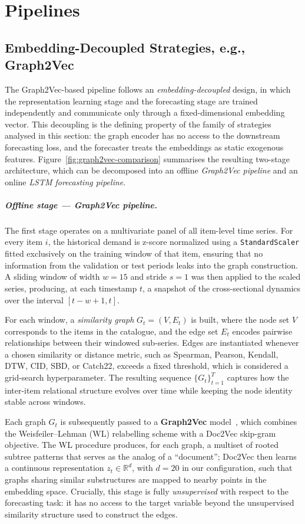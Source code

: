 \chapter{Pipelines}
\section{Embedding-Decoupled Strategies, e.g., Graph2Vec}

The Graph2Vec-based pipeline follows an \emph{embedding-decoupled} design, in which the representation learning stage and the forecasting stage are trained independently and communicate only through a fixed-dimensional embedding vector. This decoupling is the defining property of the family of strategies analysed in this section: the graph encoder has no access to the downstream forecasting loss, and the forecaster treats the embeddings as static exogenous features. Figure~\ref{fig:graph2vec-comparison} summarises the resulting two-stage architecture, which can be decomposed into an offline \emph{Graph2Vec pipeline} and an online \emph{LSTM forecasting pipeline}.

\paragraph{Offline stage --- Graph2Vec pipeline.}
The first stage operates on a multivariate panel of all item-level time series. For every item \(i\), the historical demand is z-score normalized using a \texttt{StandardScaler} fitted exclusively on the training window of that item, ensuring that no information from the validation or test periods leaks into the graph construction. A sliding window of width \(w=15\) and stride \(s=1\) was then applied to the scaled series, producing, at each timestamp \(t\), a snapshot of the cross-sectional dynamics over the interval \([t-w+1,t]\).

For each window, a \emph{similarity graph} \(G_t=(V,E_t)\) is built, where the node set \(V\) corresponds to the items in the catalogue, and the edge set \(E_t\) encodes pairwise relationships between their windowed sub-series. Edges are instantiated whenever a chosen similarity or distance metric, such as Spearman, Pearson, Kendall, DTW, CID, SBD, or Catch22, exceeds a fixed threshold, which is considered a grid-search hyperparameter. The resulting sequence \(\{G_t\}_{t=1}^{T}\) captures how the inter-item relational structure evolves over time while keeping the node identity stable across windows.

Each graph \(G_t\) is subsequently passed to a \textbf{Graph2Vec} model~\cite{narayanan2017graph2vec}, which combines the Weisfeiler--Lehman (WL) relabelling scheme with a Doc2Vec skip-gram objective. The WL procedure produces, for each graph, a multiset of rooted subtree patterns that serves as the analog of a ``document''; Doc2Vec then learns a continuous representation \(z_t \in \mathbb{R}^{d}\), with \(d=20\) in our configuration, such that graphs sharing similar substructures are mapped to nearby points in the embedding space. Crucially, this stage is fully \emph{unsupervised} with respect to the forecasting task: it has no access to the target variable beyond the unsupervised similarity structure used to construct the edges.

